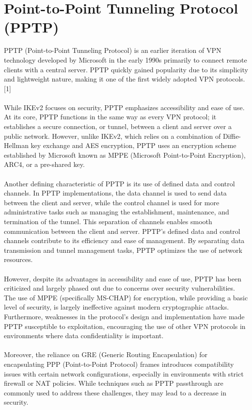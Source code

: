 \documentclass[runningheads]{llncs}
\begin{document}
\section{Point-to-Point Tunneling Protocol (PPTP)}
PPTP (Point-to-Point Tunneling Protocol) is an earlier iteration of VPN technology developed by Microsoft in the early 1990s primarily to connect remote clients with a central server. PPTP quickly gained popularity due to its simplicity and lightweight nature, making it one of the first widely adopted VPN protocols.[1]\\
\\
While IKEv2 focuses on security, PPTP emphasizes accessibility and ease of use. At its core, PPTP functions in the same way as every VPN protocol; it establishes a secure connection, or tunnel, between a client and server over a public network. However, unlike IKEv2, which relies on a combination of Diffie-Hellman key exchange and AES encryption, PPTP uses an encryption scheme established by Microsoft known as MPPE (Microsoft Point-to-Point Encryption), ARC4, or a pre-shared key.\\
\\
Another defining characteristic of PPTP is its use of defined data and control channels. In PPTP implementations, the data channel is used to send data between the client and server, while the control channel is used for more administrative tasks such as managing the establishment, maintenance, and termination of the tunnel. This separation of channels enables smooth communication between the client and server. PPTP’s defined data and control channels contribute to its efficiency and ease of management. By separating data transmission and tunnel management tasks, PPTP optimizes the use of network resources.\\
\\
However, despite its advantages in accessibility and ease of use, PPTP has been criticized and largely phased out due to concerns over security vulnerabilities. The use of MPPE (specifically MS-CHAP) for encryption, while providing a basic level of security, is largely ineffective against modern cryptographic attacks. Furthermore, weaknesses in the protocol’s design and implementation have made PPTP susceptible to exploitation, encouraging the use of other VPN protocols in environments where data confidentiality is important.\\
\\
Moreover, the reliance on GRE (Generic Routing Encapsulation) for encapsulating PPP (Point-to-Point Protocol) frames introduces compatibility issues with certain network configurations, especially in environments with strict firewall or NAT policies. While techniques such as PPTP passthrough are commonly used to address these challenges, they may lead to a decrease in security.
\end{document}
